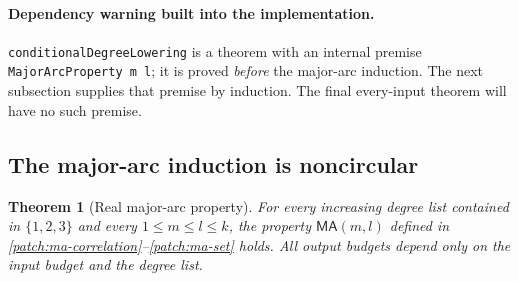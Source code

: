 \documentclass[11pt]{article}
\newtheorem{theorem}{Theorem}[section]
\theoremstyle{definition}
\newcommand{\pid}[1]{\nolinkurl{#1}}
\begin{document}
\paragraph{Dependency warning built into the implementation.}
\pid{conditionalDegreeLowering} is a theorem with an internal premise
\pid{MajorArcProperty m l}; it is proved \emph{before} the major-arc induction.
The next subsection supplies that premise by induction.  The final every-input theorem
will have no such premise.


\subsection{The major-arc induction is noncircular}\label{patch:major-induction}
\begin{theorem}[Real major-arc property]\label{patch:major-arc}
For every increasing degree list contained in $\{1,2,3\}$ and every $1\leq m\leq l\leq k$,
the property $\mathsf{MA}(m,l)$ defined in \eqref{patch:ma-correlation}--\eqref{patch:ma-set}
holds.  All output budgets depend only on the input budget and the degree list.
\end{theorem}
\end{document}
